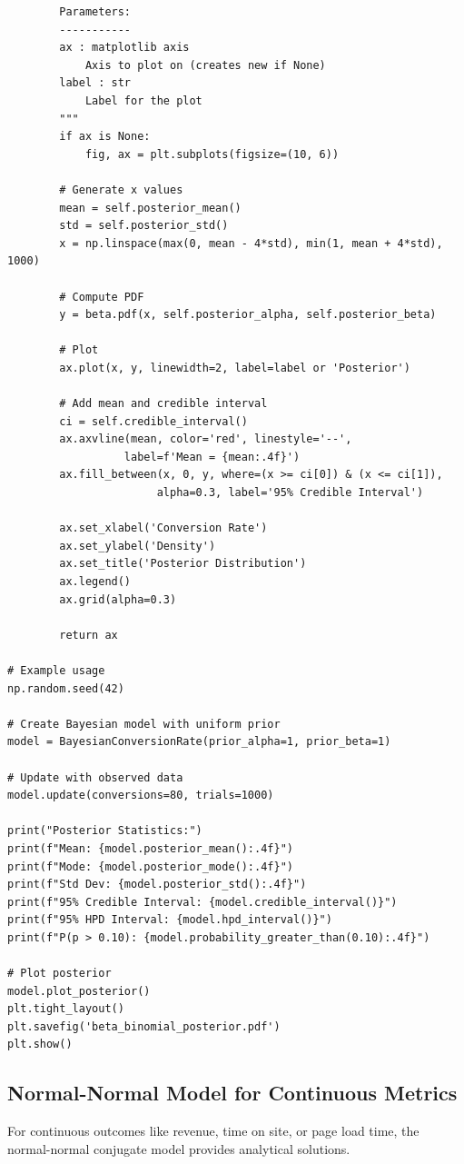 \begin{lstlisting}
        Parameters:
        -----------
        ax : matplotlib axis
            Axis to plot on (creates new if None)
        label : str
            Label for the plot
        """
        if ax is None:
            fig, ax = plt.subplots(figsize=(10, 6))

        # Generate x values
        mean = self.posterior_mean()
        std = self.posterior_std()
        x = np.linspace(max(0, mean - 4*std), min(1, mean + 4*std), 1000)

        # Compute PDF
        y = beta.pdf(x, self.posterior_alpha, self.posterior_beta)

        # Plot
        ax.plot(x, y, linewidth=2, label=label or 'Posterior')

        # Add mean and credible interval
        ci = self.credible_interval()
        ax.axvline(mean, color='red', linestyle='--',
                  label=f'Mean = {mean:.4f}')
        ax.fill_between(x, 0, y, where=(x >= ci[0]) & (x <= ci[1]),
                       alpha=0.3, label='95% Credible Interval')

        ax.set_xlabel('Conversion Rate')
        ax.set_ylabel('Density')
        ax.set_title('Posterior Distribution')
        ax.legend()
        ax.grid(alpha=0.3)

        return ax

# Example usage
np.random.seed(42)

# Create Bayesian model with uniform prior
model = BayesianConversionRate(prior_alpha=1, prior_beta=1)

# Update with observed data
model.update(conversions=80, trials=1000)

print("Posterior Statistics:")
print(f"Mean: {model.posterior_mean():.4f}")
print(f"Mode: {model.posterior_mode():.4f}")
print(f"Std Dev: {model.posterior_std():.4f}")
print(f"95% Credible Interval: {model.credible_interval()}")
print(f"95% HPD Interval: {model.hpd_interval()}")
print(f"P(p > 0.10): {model.probability_greater_than(0.10):.4f}")

# Plot posterior
model.plot_posterior()
plt.tight_layout()
plt.savefig('beta_binomial_posterior.pdf')
plt.show()
\end{lstlisting}

\subsection{Normal-Normal Model for Continuous Metrics}

For continuous outcomes like revenue, time on site, or page load time, the normal-normal conjugate model provides analytical solutions.

